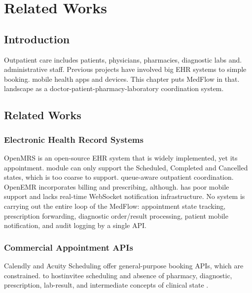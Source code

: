 \documentclass[12pt,a4paper]{report}
\begin{document}
\chapter{Related Works}
\label{chap:related-works}

\section{Introduction}

Outpatient care includes patients, physicians, pharmacies, diagnostic labs and.
administrative staff. Previous projects have involved big EHR systems to simple booking.
mobile health apps and devices. This chapter puts MedFlow in that.
landscape as a doctor-patient-pharmacy-laboratory coordination system.


\section{Related Works}

\subsection{Electronic Health Record Systems}

OpenMRS \cite{r7} is an open-source EHR system that is widely implemented, yet its appointment.
module can only support the Scheduled, Completed and Cancelled states, which is too coarse to support.
queue-aware outpatient coordination. OpenEMR \cite{r8} incorporates billing and prescribing, although.
has poor mobile support and lacks real-time WebSocket notification infrastructure.
No system is carrying out the entire loop of the MedFlow: appointment state tracking,
prescription forwarding, diagnostic order/result processing, patient mobile notification,
and audit logging by a single API.

\subsection{Commercial Appointment APIs}

Calendly and Acuity Scheduling offer general-purpose booking APIs, which are constrained.
to hostinvitee scheduling and absence of pharmacy, diagnostic, prescription, lab-result, and
intermediate concepts of clinical state \cite{r9}.
\end{document}
